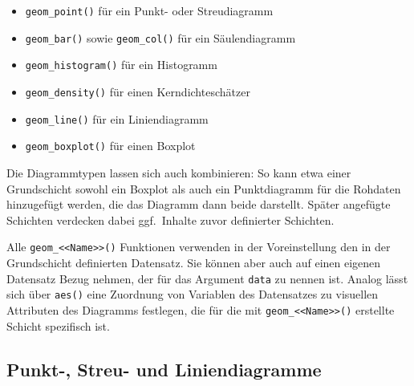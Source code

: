 \begin{itemize}
\item {} \lstinline!geom_point()! für ein Punkt- oder Streudiagramm
\item {} \lstinline!geom_bar()! sowie  \lstinline!geom_col()! für ein Säulendiagramm
\item {} \lstinline!geom_histogram()! für ein Histogramm
\item {} \lstinline!geom_density()! für einen Kerndichteschätzer
\item {} \lstinline!geom_line()! für ein Liniendiagramm
\item {} \lstinline!geom_boxplot()! für einen Boxplot
\end{itemize}

Die Diagrammtypen lassen sich auch kombinieren: So kann etwa einer Grundschicht sowohl ein Boxplot als auch ein Punktdiagramm für die Rohdaten hinzugefügt werden, die das Diagramm dann beide darstellt. Später angefügte Schichten verdecken dabei ggf.\ Inhalte zuvor definierter Schichten.

Alle \lstinline!geom_<<Name>>()! Funktionen verwenden in der Voreinstellung den in der Grundschicht definierten Datensatz. Sie können aber auch auf einen eigenen Datensatz Bezug nehmen, der für das Argument \lstinline!data! zu nennen ist. Analog lässt sich über \lstinline!aes()! eine Zuordnung von Variablen des Datensatzes zu visuellen Attributen des Diagramms festlegen, die für die mit \lstinline!geom_<<Name>>()! erstellte Schicht spezifisch ist.

\subsection{Punkt-, Streu- und Liniendiagramme}
\label{sec:ggplotPoint}

